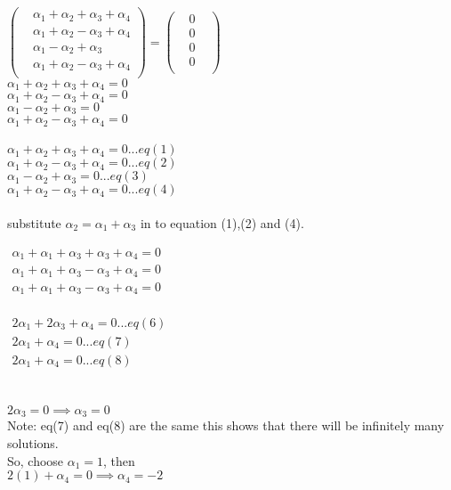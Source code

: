 \documentclass[45pt]{article}
\begin{document}
\begin{enumerate}
$ \begin{pmatrix}
    &\alpha_1+\alpha_2+\alpha_3 +\alpha_4\\
    &\alpha_1+\alpha_2-\alpha_3 +\alpha_4\\
    &\alpha_1-\alpha_2+\alpha_3\\
    &\alpha_1+\alpha_2-\alpha_3 +\alpha_4\\
  \end{pmatrix} =\begin{pmatrix}
    &0&\\&0&\\ &0&\\&0&\\
  \end{pmatrix}$\\
      $\alpha_1+\alpha_2+\alpha_3 +\alpha_4 =0$\\
      $\alpha_1+\alpha_2-\alpha_3 +\alpha_4=0$\\
      $\alpha_1-\alpha_2+\alpha_3=0$\\
      $\alpha_1+\alpha_2-\alpha_3 +\alpha_4=0$\\
  
 \\
      $\alpha_1+\alpha_2+\alpha_3 +\alpha_4 =0...eq(1)$\\
      $\alpha_1+\alpha_2-\alpha_3 +\alpha_4=0...eq(2)$\\
      $\alpha_1-\alpha_2+\alpha_3=0...eq(3)$\\
      $\alpha_1+\alpha_2-\alpha_3 +\alpha_4=0...eq(4)$\\

\\
 substitute $\alpha_2=\alpha_1+\alpha_3$ in to equation (1),(2) and (4).
    
$ \begin{matrix}
       \alpha_1+\alpha_1+\alpha_3+\alpha_3 +\alpha_4 =0\\
      \alpha_1+\alpha_1+\alpha_3-\alpha_3 +\alpha_4=0\\
      \alpha_1+\alpha_1+\alpha_3-\alpha_3 +\alpha_4=0
\end{matrix} $\\\\

$\begin{matrix}
     2\alpha_1+2\alpha_3 +\alpha_4 =0 ...eq(6)\\
     2\alpha_1+\alpha_4=0...eq(7)\\
     2\alpha_1+\alpha_4=0...eq(8)
\end{matrix}$
  \\\\
\\
$2\alpha_3 = 0 \implies \alpha_3=0$\\
Note: eq(7) and eq(8) are the same this shows that there will be infinitely many solutions.\\ 
So, choose $\alpha_1=1$, then\\
$2(1)+\alpha_4=0 \implies \alpha_4=-2$\\


\end{enumerate}
\end{document}
